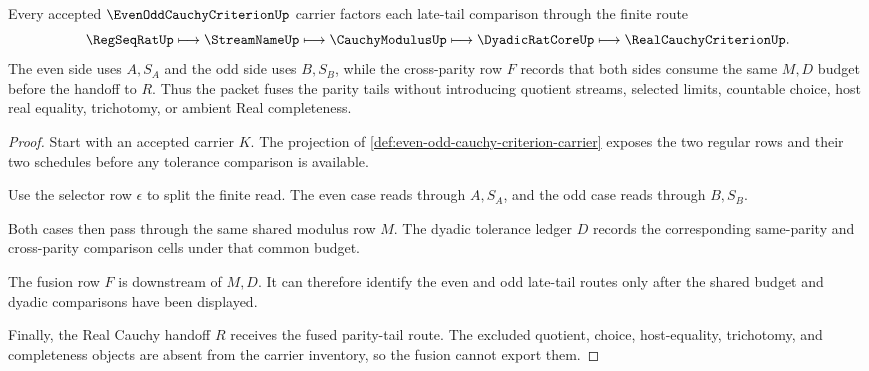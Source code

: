 \begin{theorem}
\label{thm:even-odd-cauchy-criterion-parity-tail-fusion}
Every accepted $\EvenOddCauchyCriterionUp$ carrier factors each late-tail comparison through the finite route
$$
\RegSeqRatUp \longmapsto \StreamNameUp \longmapsto \CauchyModulusUp \longmapsto \DyadicRatCoreUp \longmapsto \RealCauchyCriterionUp .
$$
The even side uses $A,S_A$ and the odd side uses $B,S_B$, while the cross-parity row $F$ records that both sides consume the same $M,D$ budget before the handoff to $R$. Thus the packet fuses the parity tails without introducing quotient streams, selected limits, countable choice, host real equality, trichotomy, or ambient Real completeness.
\end{theorem}
\begin{proof}
Start with an accepted carrier $K$. The projection of \autoref{def:even-odd-cauchy-criterion-carrier} exposes the two regular rows and their two schedules before any tolerance comparison is available.

Use the selector row $\epsilon$ to split the finite read. The even case reads through $A,S_A$, and the odd case reads through $B,S_B$.

Both cases then pass through the same shared modulus row $M$. The dyadic tolerance ledger $D$ records the corresponding same-parity and cross-parity comparison cells under that common budget.

The fusion row $F$ is downstream of $M,D$. It can therefore identify the even and odd late-tail routes only after the shared budget and dyadic comparisons have been displayed.

Finally, the Real Cauchy handoff $R$ receives the fused parity-tail route. The excluded quotient, choice, host-equality, trichotomy, and completeness objects are absent from the carrier inventory, so the fusion cannot export them.
\end{proof}

